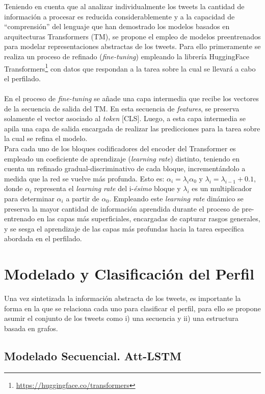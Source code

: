 	Teniendo en cuenta que al analizar individualmente los tweets la cantidad de información a procesar es reducida considerablemente y a la capacidad de ``comprensión'' del lenguaje que han demostrado los modelos basados en arquitecturas Transformers (TM), se propone el empleo de modelos preentrenados para modelar representaciones abstractas de los tweets. Para ello primeramente se realiza un proceso de refinado (\textit{fine-tuning}) empleando la librería HuggingFace Transformers\footnote{\url{https://huggingface.co/transformers}} con datos que respondan a la tarea sobre la cual se llevará a cabo el perfilado. 
	\\\\
	En el proceso de \textit{fine-tuning} se añade una capa intermedia que recibe los vectores de la secuencia de salida del TM. En esta secuencia de \textit{features}, se preserva solamente el vector asociado al \textit{token} [CLS]. Luego, a esta capa intermedia se apila una capa de salida encargada de realizar las predicciones para la tarea sobre la cual  se refina el modelo.
	\\
	Para cada uno de los bloques codificadores del encoder del Transformer es empleado un coeficiente de aprendizaje (\textit{learning rate}) distinto, teniendo en cuenta un refinado gradual-discriminativo de cada bloque, incrementándolo a medida que la red se vuelve más profunda. Esto es: $\alpha_i = \lambda_i \alpha_0 \text{ y } \lambda_i = \lambda_{i-1} + 0\text{.}1$, donde $\alpha_i$ representa el \textit{learning rate} del i-\textit{\'{e}simo} bloque y $\lambda_i$ es un multiplicador para determinar $\alpha_i$ a partir de $\alpha_0$. Empleando este \textit{learning rate} dinámico se preserva la mayor cantidad de información aprendida durante el proceso de pre-entrenado en las capas más superficiales, encargadas de capturar rasgos generales, y se sesga el aprendizaje de las capas más profundas hacia la tarea específica abordada en el perfilado.
	\section{Modelado  y Clasificación del Perfil}
	
	Una vez sintetizada la información abstracta de los tweets, es importante la forma en la que se relaciona cada uno para clasificar el perfil, para ello se propone asumir el conjunto de los tweets como i) una secuencia y ii) una estructura basada en grafos.
	
	\subsection{Modelado Secuencial. Att-LSTM}\label{att-lstm}
	
